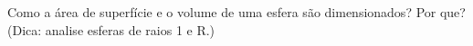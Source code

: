 Como a área de superfície e o volume de uma esfera são dimensionados? Por que? (Dica: analise esferas de raios 1 e R.)

